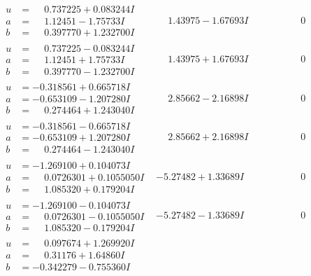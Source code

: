 \documentclass[1p]{elsarticle_modified}
\theoremstyle{definition}
\begin{document}
$$\begin{array}{c|c|c}
\begin{aligned}
u &= \phantom{-}0.737225 + 0.083244 I \\
a &= \phantom{-}1.12451 - 1.75733 I \\
b &= \phantom{-}0.397770 + 1.232700 I\end{aligned}
 & \phantom{-}1.43975 - 1.67693 I & \phantom{-0.000000 } 0 \\ \hline\begin{aligned}
u &= \phantom{-}0.737225 - 0.083244 I \\
a &= \phantom{-}1.12451 + 1.75733 I \\
b &= \phantom{-}0.397770 - 1.232700 I\end{aligned}
 & \phantom{-}1.43975 + 1.67693 I & \phantom{-0.000000 } 0 \\ \hline\begin{aligned}
u &= -0.318561 + 0.665718 I \\
a &= -0.653109 - 1.207280 I \\
b &= \phantom{-}0.274464 + 1.243040 I\end{aligned}
 & \phantom{-}2.85662 - 2.16898 I & \phantom{-0.000000 } 0 \\ \hline\begin{aligned}
u &= -0.318561 - 0.665718 I \\
a &= -0.653109 + 1.207280 I \\
b &= \phantom{-}0.274464 - 1.243040 I\end{aligned}
 & \phantom{-}2.85662 + 2.16898 I & \phantom{-0.000000 } 0 \\ \hline\begin{aligned}
u &= -1.269100 + 0.104073 I \\
a &= \phantom{-}0.0726301 + 0.1055050 I \\
b &= \phantom{-}1.085320 + 0.179204 I\end{aligned}
 & -5.27482 + 1.33689 I & \phantom{-0.000000 } 0 \\ \hline\begin{aligned}
u &= -1.269100 - 0.104073 I \\
a &= \phantom{-}0.0726301 - 0.1055050 I \\
b &= \phantom{-}1.085320 - 0.179204 I\end{aligned}
 & -5.27482 - 1.33689 I & \phantom{-0.000000 } 0 \\ \hline\begin{aligned}
u &= \phantom{-}0.097674 + 1.269920 I \\
a &= \phantom{-}0.31176 + 1.64860 I \\
b &= -0.342279 - 0.755360 I\end{aligned}

\end{array}$$
\end{document}
